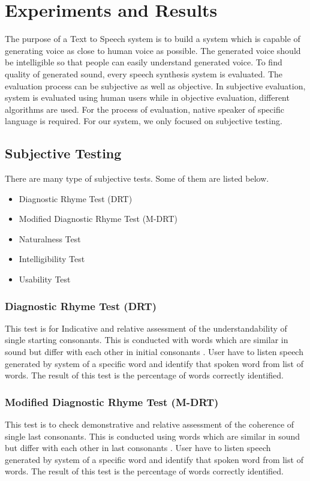 \chapter{Experiments and Results}

The purpose of a Text to Speech system is to build a system which is capable of generating voice as close to human voice as possible. The generated voice should be intelligible so that people can easily understand generated voice. To find quality of generated sound, every speech synthesis system is evaluated. The evaluation process can be subjective as well as objective. In subjective evaluation, system is evaluated using human users while in objective evaluation, different algorithms are used. For the process of evaluation, native speaker of specific language is required. For our system, we only focused on subjective testing.

\section{Subjective Testing}

There are many type of subjective tests. Some of them are listed below.

\begin{itemize}
  \item Diagnostic Rhyme Test (DRT)
  \item Modified Diagnostic Rhyme Test (M-DRT)
  \item Naturalness Test
  \item Intelligibility Test
  \item Usability Test
\end{itemize}

\subsection{Diagnostic Rhyme Test (DRT)}
This test is for Indicative and relative assessment of the understandability of single starting consonants. This is conducted with words which are similar in sound but differ with each other in initial consonants \cite{voiers1977diagnostic}. User have to listen speech generated by system of a specific word and identify that spoken word from list of words. The result of this test is the percentage of words correctly identified.

\subsection{Modified Diagnostic Rhyme Test (M-DRT)}
This test is to check demonstrative and relative assessment of the coherence of single last consonants. This is conducted using words which are similar in sound but differ with each other in last consonants \cite{house1965articulation}. User have to listen speech generated by system of a specific word and identify that spoken word from list of words. The result of this test is the percentage of words correctly identified.

